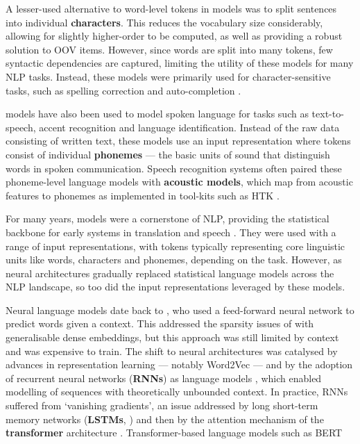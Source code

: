 A lesser-used alternative to word-level tokens in \ngram models was to split sentences into individual \textbf{characters}. This reduces the vocabulary size considerably, allowing for slightly higher-order \ngrams to be computed, as well as providing a robust solution to OOV items. However, since words are split into many tokens, few syntactic dependencies are captured, limiting the utility of these models for many NLP tasks. Instead, these models were primarily used for character-sensitive tasks, such as spelling correction and auto-completion \citep{cucerzan_spelling_2004}.

\ngram models have also been used to model spoken language for tasks such as text-to-speech, accent recognition and language identification. Instead of the raw data consisting of written text, these models use an input representation where tokens consist of individual \textbf{phonemes} --- the basic units of sound that distinguish words in spoken communication. Speech recognition systems often paired these phoneme-level language models with \textbf{acoustic models}, which map from acoustic features to phonemes as implemented in tool-kits such as HTK \citep{young2006htk}.

For many years, \ngram models were a cornerstone of NLP, providing the statistical backbone for early systems in translation and speech \citep{jurafsky2009speech}. They were used with a range of input representations, with tokens typically representing core linguistic units like words, characters and phonemes, depending on the task. However, as neural architectures gradually replaced statistical language models across the NLP landscape, so too did the input representations leveraged by these models.

Neural language models date back to \citet{bengio2003neural}, who used a feed-forward neural network to predict words given a context. This addressed the sparsity issues of \ngrams with generalisable dense embeddings, but this approach was still limited by context and was expensive to train. The shift to neural architectures was catalysed by advances in representation learning — notably Word2Vec \citep{mikolov_distributed_2013} — and by the adoption of recurrent neural networks (\textbf{RNNs}) as language models \citep{mikolov2010recurrent}, which enabled modelling of sequences with theoretically unbounded context. In practice, RNNs suffered from `vanishing gradients', an issue addressed by long short-term memory networks (\textbf{LSTMs}, \citet{sundermeyer2012lstm}) and then by the attention mechanism of the \textbf{transformer} architecture \citep{vaswani2017attention}. Transformer-based language models such as BERT

